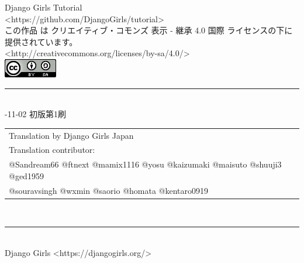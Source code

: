 \reviewcolophon
\thispagestyle{empty}

\vspace*{\fill}

{\noindent\reviewtitlefont\Large Django Girls Tutorial} \\
\medskip
{\noindent <https://github.com/DjangoGirls/tutorial>} \\
{\noindent この作品 は クリエイティブ・コモンズ 表示 - 継承 4.0 国際 ライセンスの下に提供されています。} \\
{\noindent <http://creativecommons.org/licenses/by-sa/4.0/>} \\

\includegraphics[]{./images/ccby.png}

\noindent\rule[8pt]{\textwidth}{1pt} \\
{-11-02 初版第1刷
}

\begin{tabular}{ll}
Translation by Django Girls Japan \\

Translation contributor: \\

@Sandream66 @ftnext @mamix1116 @yosu @kaizumaki @maisuto @shuuji3 @ged1959 \\ @souravsingh @wxmin @saorio @homata @kentaro0919 \\

\end{tabular}
　\\
\rule[0pt]{\textwidth}{1pt} \\
{\noindent Django Girls <https://djangogirls.org/>} \\

